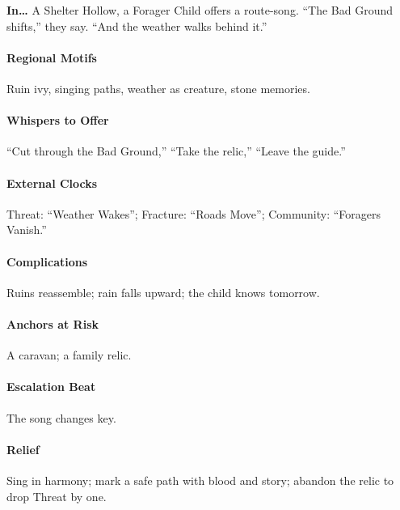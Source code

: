 \textbf{In…} A Shelter Hollow, a Forager Child offers a route-song. ``The Bad Ground shifts,'' they say. ``And the weather walks behind it.''
\paragraph{Regional Motifs} Ruin ivy, singing paths, weather as creature, stone memories.
\paragraph{Whispers to Offer} ``Cut through the Bad Ground,'' ``Take the relic,'' ``Leave the guide.''
\paragraph{External Clocks} Threat: ``Weather Wakes''; Fracture: ``Roads Move''; Community: ``Foragers Vanish.''
\paragraph{Complications} Ruins reassemble; rain falls upward; the child knows tomorrow.
\paragraph{Anchors at Risk} A caravan; a family relic.
\paragraph{Escalation Beat} The song changes key.
\paragraph{Relief} Sing in harmony; mark a safe path with blood and story; abandon the relic to drop Threat by one.
